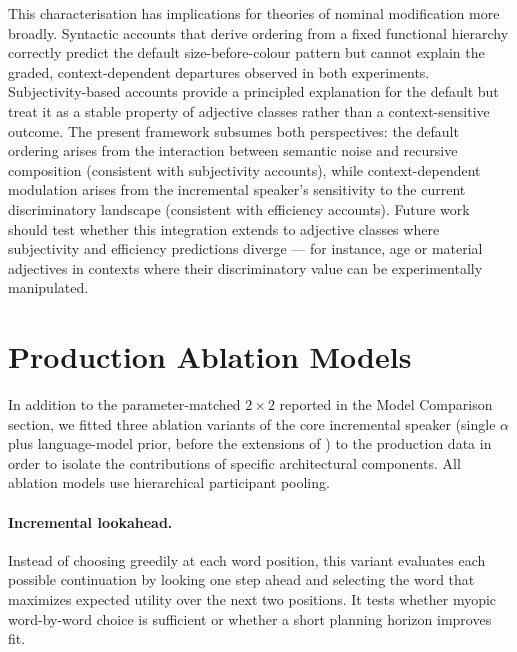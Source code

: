 \documentclass[man,floatsintext]{apa7}
\begin{document}
This characterisation has implications for theories of nominal modification more broadly.
Syntactic accounts that derive ordering from a fixed functional hierarchy \citep{cinque1994,scott2002} correctly predict the default size-before-colour pattern but cannot explain the graded, context-dependent departures observed in both experiments.
Subjectivity-based accounts \citep{scontras2017subjectivity,franke2019subjectivity} provide a principled explanation for the default but treat it as a stable property of adjective classes rather than a context-sensitive outcome.
The present framework subsumes both perspectives: the default ordering arises from the interaction between semantic noise and recursive composition (consistent with subjectivity accounts), while context-dependent modulation arises from the incremental speaker's sensitivity to the current discriminatory landscape (consistent with efficiency accounts).
Future work should test whether this integration extends to adjective classes where subjectivity and efficiency predictions diverge --- for instance, age or material adjectives in contexts where their discriminatory value can be experimentally manipulated.


\appendix
\section{Production Ablation Models}
\label{sec:appendix:ablations}

In addition to the parameter-matched $2 \times 2$ reported in the Model Comparison section, we fitted three ablation variants of the core incremental speaker (single $\alpha$ plus language-model prior, before the extensions of ) to the production data in order to isolate the contributions of specific architectural components.
All ablation models use hierarchical participant pooling.

\paragraph{Incremental lookahead.} Instead of choosing greedily at each word position, this variant evaluates each possible continuation by looking one step ahead and selecting the word that maximizes expected utility over the next two positions.
It tests whether myopic word-by-word choice is sufficient or whether a short planning horizon improves fit.
\end{document}
